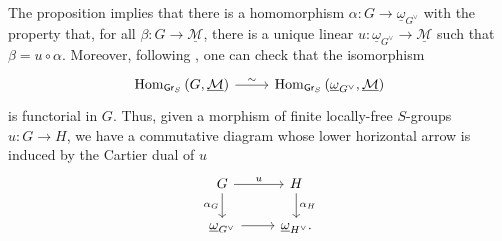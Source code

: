 \documentclass[../Main]{subfiles}
\begin{document}
\begin{rem}[]\label{rem:ReprMorExt}
	The proposition implies that there is
	a homomorphism $\alpha\colon G \to \underline{\omega}_{G^\vee}$
	with the property that, for all $\beta\colon G \to \underline{\mathcal{M}}$,
	there is a unique linear $u\colon \underline{\omega}_{G^\vee} \to \underline{\mathcal{M}}$
	such that $\beta = u \circ \alpha$.
	Moreover, following {\cite[Chapter IV, remark 1.6]{Messing}},
	one can check that the isomorphism
	\begin{equation*}
	\begin{tikzcd}[row sep = 0ex
		,/tikz/column 1/.append style={anchor=base east}
		,/tikz/column 2/.append style={anchor=base west}]
		\mathrm{Hom}_{\mathsf{Gr}_S} \left( G, \underline{\mathcal{M}} \right)
		\arrow[r, "\sim", rightarrow] &
		\mathrm{Hom}_{\mathsf{Gr}_S} \left( \underline{\omega}_{G^\vee}, \underline{\mathcal{M}} \right)
	\end{tikzcd}
	\end{equation*} 
	is functorial in $G$.
	Thus, given a morphism of finite locally-free $S$-groups $u\colon G \to H$,
	we have a commutative diagram whose lower horizontal arrow is
	induced by the Cartier dual of $u$
	\begin{equation}\label{diag:functorialityRepresent}
	\begin{tikzcd}
		G \arrow[r, "u", rightarrow] 
		\arrow[d, "\alpha_G"', rightarrow] &
		H \arrow[d, "\alpha_H", rightarrow] \\
		\underline{\omega}_{G^\vee} \arrow[r, "", rightarrow] &
		\underline{\omega}_{H^\vee}
	.\end{tikzcd}
	\end{equation}
\end{rem}
\end{document}
